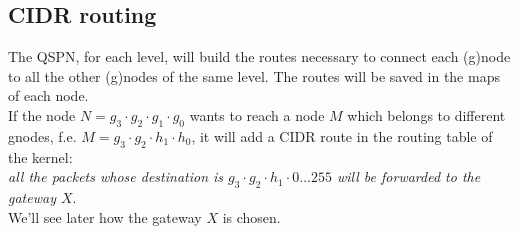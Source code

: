 \documentclass[a4paper]{article}
\begin{document}
\subsection{CIDR routing}
The QSPN, for each level, will build the routes necessary to connect each
(g)node to all the other (g)nodes of the same level. The routes will be saved
in the maps of each node.\\

If the node $N=g_3\cdot g_2\cdot g_1 \cdot g_0$ wants to reach a node $M$ which
belongs to different gnodes, f.e. $M=g_3\cdot g_2\cdot h_1 \cdot h_0$, it will
add a CIDR\cite{CIDR} route in the routing table of the kernel:\\
\emph{all the packets whose destination is $g_3\cdot g_2\cdot h_1 \cdot 0\dots
255$ will be forwarded to the gateway $X$}.\\

We'll see later how the gateway $X$ is chosen.
\end{document}
